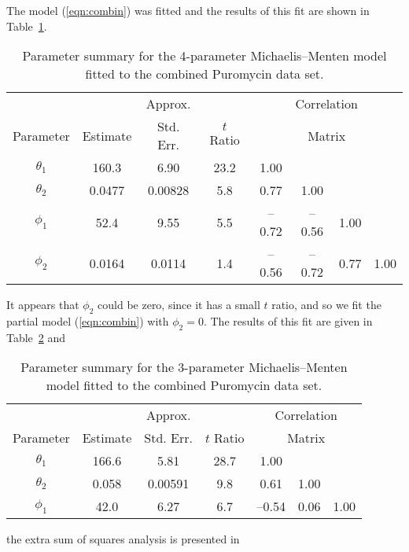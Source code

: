 \begin{example}
The model (\ref{eqn:combin}) was fitted and the results of this fit are
shown in Table~\ref{tbl:treloar3}.
  \begin{table}
   \caption{
   Parameter summary for the 4-parameter Michaelis--Menten model fitted
   to the combined Puromycin data set.
   }\label{tbl:treloar3}
\begin{center}
\begin{tabular}{cccccccc} \hline
& &\multicolumn{1}{c}{Approx.}&&\multicolumn{4}{c}{Correlation}\\
\multicolumn{1}{c}{Parameter} &\multicolumn{1}{c}{Estimate}& \multicolumn{1}{c}{Std. Err.}&\multicolumn{1}{c}{$t$ Ratio} &\multicolumn{4}{c}{Matrix}\\ \hline
$\theta_{1}$ &160.3 & 6.90 & 23.2 &1.00\\
$\theta_{2}$ & 0.0477 & 0.00828 & 5.8 & 0.77 & 1.00\\
$\phi_{1}$ & 52.4 & 9.55 & 5.5 &--\/0.72 & --\/0.56 & 1.00\\
$\phi_{2}$ & 0.0164 & 0.0114 &1.4 &--\/0.56 & --\/0.72 & 0.77 & 1.00\\ \hline
\end{tabular}
\end{center}
\end{table}
It appears that $\phi_{2}$ could be zero, since it has a small
$t$ ratio, and so we fit the
partial model (\ref{eqn:combin}) with $\phi_2 = 0$.
The results of this fit are given in
Table~\ref{tbl:treloar4} and
  \begin{table}
    \caption{
    Parameter summary for the 3-parameter Michaelis--Menten model fitted
    to the combined Puromycin data set.
    }\label{tbl:treloar4}
\begin{center}
\begin{tabular}{ccccccc}\hline
& & \multicolumn{1}{c}{Approx.}&&\multicolumn{3}{c}{Correlation}\\
\multicolumn{1}{c}{Parameter} &\multicolumn{1}{c}{Estimate}& \multicolumn{1}{c}{Std. Err.} &\multicolumn{1}{c}{$t$ Ratio} & \multicolumn{3}{c}{Matrix}\\ \hline
$\theta_{1}$&166.6&5.81&28.7&1.00\\
$\theta_{2}$&0.058&0.00591&9.8&0.61&1.00\\
$\phi_{1}$&42.0&6.27&6.7&--\/0.54&0.06&1.00\\ \hline
\end{tabular}
\end{center}
\end{table}
the extra sum of squares analysis is presented in

\end{example}
